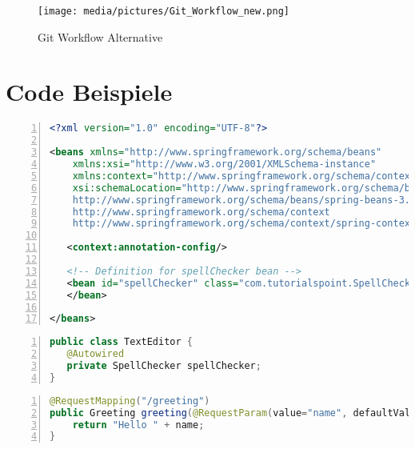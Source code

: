 \documentclass[00_Praxissemesterbericht.tex]{subfiles}
\begin{document}
\begin{figure}[!htbp]
\caption{Git Workflow Alternative}
\label{fig:GIT_WORKFLOW_ALTERNATIVE}
\texttt{[image: media/pictures/Git\_Workflow\_new.png]}
\end{figure}
\clearpage

\section{Code Beispiele}
\label{sec:CODE}

\begin{lstlisting}[language=xml, frame=single, caption=Spring Konfiguration XML (Quelle{\cite{Spring_CONFIG}}), captionpos=t, breaklines=true, numbers=left, showstringspaces=false, tabsize=2, label=lst:SPRING_CONFIG_XML]
<?xml version="1.0" encoding="UTF-8"?>

<beans xmlns="http://www.springframework.org/schema/beans"
    xmlns:xsi="http://www.w3.org/2001/XMLSchema-instance"
    xmlns:context="http://www.springframework.org/schema/context"
    xsi:schemaLocation="http://www.springframework.org/schema/beans
    http://www.springframework.org/schema/beans/spring-beans-3.0.xsd
    http://www.springframework.org/schema/context
    http://www.springframework.org/schema/context/spring-context-3.0.xsd">

   <context:annotation-config/>

   <!-- Definition for spellChecker bean -->
   <bean id="spellChecker" class="com.tutorialspoint.SpellChecker">
   </bean>

</beans>
\end{lstlisting}

\begin{lstlisting}[language=java, frame=single, caption=Spring Konfiguration Annotation (Quelle{\cite{Spring_CONFIG}}), captionpos=t, breaklines=true, numbers=left, showstringspaces=false, tabsize=2, label=lst:SPRING_CONFIG_ANNOTATION]
public class TextEditor {
   @Autowired
   private SpellChecker spellChecker;
}
\end{lstlisting}
\clearpage
\begin{lstlisting}[language=java, frame=single, caption = Spring Webservice Beispiel (Quelle{\cite[vgl.]{Spring_REST}}), captionpos=t, breaklines=true, showstringspaces=false, numbers = left, tabsize = 2, label=lst:SPRING_WS_JAVA]
@RequestMapping("/greeting")
public Greeting greeting(@RequestParam(value="name", defaultValue="World") String name){
	return "Hello " + name;
}
\end{lstlisting}
\end{document}

